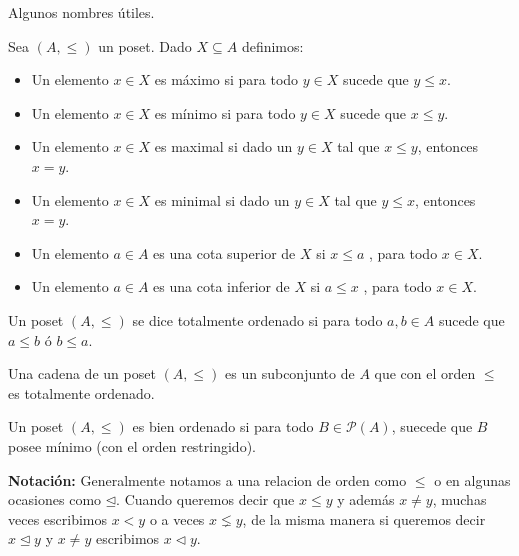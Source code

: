\documentclass[12pt,a4paper]{book}
\begin{document}
Algunos nombres útiles.

\begin{defi} %
Sea $(A,\leq)$ un poset. Dado $ X \subseteq A$ definimos:
\begin{itemize}
\item Un elemento $x \in X$ es máximo si para todo $y \in X $ sucede que $ y \leq x$.
\item Un elemento $x \in X$ es mínimo si para todo $y \in X $ sucede que $ x \leq y$.
\item Un elemento $x \in X$ es maximal si dado un $ y \in X $ tal que $ x \leq y$, entonces $ x = y$.
\item Un elemento $x \in X$ es minimal si dado un $ y \in X $ tal que $ y \leq x$, entonces $ x = y$.
\item Un elemento $a \in A$ es una cota superior de $X$ si $x \leq a$ , para todo $x \in X$.
\item Un elemento $a \in A$ es una cota inferior de $X$ si $a \leq x$ , para todo $x \in X$.
\end{itemize}
\end{defi}

\begin{defi} %
Un poset $(A,\leq)$ se dice totalmente ordenado si para todo $a,b \in A$ sucede que $a \leq b$ ó $b \leq a$.
\end{defi}

\begin{defi} %
Una cadena de un poset $(A,\leq)$ es un subconjunto de $A$ que con el orden $\leq$ es totalmente ordenado.
\end{defi}

\begin{defi} %
Un poset $(A,\leq)$ es bien ordenado si para todo $B \in \mathcal{P}(A)$, suecede que $B$ posee mínimo (con el orden restringido).
\end{defi}

\textbf{Notación:} Generalmente notamos a una relacion de orden como $\leq$ o en algunas ocasiones como $\unlhd$. Cuando queremos decir que $x \leq y$ y además $x \neq y$, muchas veces escribimos $x < y$ o a veces $x \lneq y$, de la misma manera si queremos decir $x \unlhd y$ y $x \neq y$ escribimos $x \lhd y$.
\end{document}
